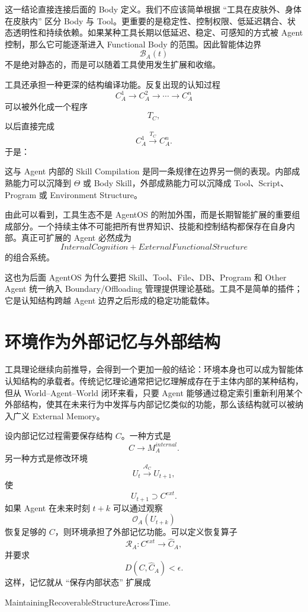 这一结论直接连接后面的 Body 定义。我们不应该简单根据 ``工具在皮肤外、身体在皮肤内'' 区分 Body 与 Tool。更重要的是稳定性、控制权限、低延迟耦合、状态透明性和持续依赖。如果某种工具长期以低延迟、稳定、可感知的方式被 Agent 控制，那么它可能逐渐进入 Functional Body 的范围。因此智能体边界
\[
\mathcal B_A(t)
\]
不是绝对静态的，而是可以随着工具使用发生扩展和收缩。

工具还承担一种更深的结构编译功能。反复出现的认知过程
\[
C_A^1\rightarrow C_A^2\rightarrow\cdots\rightarrow C_A^n
\]
可以被外化成一个程序
\[
T_C,
\]
以后直接完成
\[
C_A^1
\xrightarrow{T_C}
C_A^n.
\]
于是：
\begin{statementbox}
\centering
{}
\end{statementbox}
这与 Agent 内部的 Skill Compilation 是同一条规律在边界另一侧的表现。内部成熟能力可以沉降到 $\Theta$ 或 Body Skill，外部成熟能力可以沉降成 Tool、Script、Program 或 Environment Structure。

由此可以看到，工具生态不是 AgentOS 的附加外围，而是长期智能扩展的重要组成部分。一个持续主体不可能把所有世界知识、技能和控制结构都保存在自身内部。真正可扩展的 Agent 必然成为
\[
\boxed{
InternalCognition
+
ExternalFunctionalStructure
}
\]
的组合系统。

这也为后面 AgentOS 为什么要把 Skill、Tool、File、DB、Program 和 Other Agent 统一纳入 Boundary/Offloading 管理提供理论基础。工具不是简单的插件；它是认知结构跨越 Agent 边界之后形成的稳定功能载体。


\section{环境作为外部记忆与外部结构}

工具理论继续向前推导，会得到一个更加一般的结论：环境本身也可以成为智能体认知结构的承载者。传统记忆理论通常把记忆理解成存在于主体内部的某种结构，但从 World--Agent--World 闭环来看，只要 Agent 能够通过稳定索引重新利用某个外部结构，使其在未来行为中发挥与内部记忆类似的功能，那么该结构就可以被纳入广义 External Memory。

设内部记忆过程需要保存结构 $C$。一种方式是
\[
C
\rightarrow
M_A^{internal}.
\]
另一种方式是修改环境
\[
U_t
\xrightarrow{\mathcal A_C}
U_{t+1},
\]
使
\[
U_{t+1}
\supset
C^{ext}.
\]
如果 Agent 在未来时刻 $t+k$ 可以通过观察
\[
\mathcal O_A(U_{t+k})
\]
恢复足够的 $C$，则环境承担了外部记忆功能。可以定义恢复算子
\[
\mathcal R_A:
C^{ext}
\rightarrow
\hat C_A,
\]
并要求
\[
D(C,\hat C_A)
<
\epsilon.
\]
这样，记忆就从 ``保存内部状态'' 扩展成
\begin{statementbox}
MaintainingRecoverableStructureAcrossTime.
\end{statementbox}

